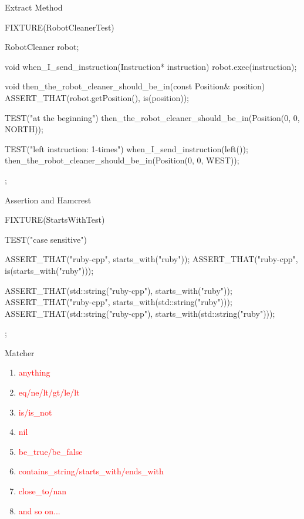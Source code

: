 \begin{frame}[fragile]{Extract Method}
\begin{c++}
FIXTURE(RobotCleanerTest)
{
    RobotCleaner robot;

    void when_I_send_instruction(Instruction* instruction)
    {
        robot.exec(instruction);
    }

    void then_the_robot_cleaner_should_be_in(const Position& position)
    {
        ASSERT_THAT(robot.getPosition(), is(position));
    }

    TEST("at the beginning")
    {
        then_the_robot_cleaner_should_be_in(Position(0, 0, NORTH));
    }

    TEST("left instruction: 1-times")
    {
        when_I_send_instruction(left());
        then_the_robot_cleaner_should_be_in(Position(0, 0, WEST));
    }
};
\end{c++}
\end{frame}

\begin{frame}[fragile]{Assertion and Hamcrest}
\begin{c++}
FIXTURE(StartsWithTest)
{
    TEST("case sensitive")
    {
        ASSERT_THAT("ruby-cpp", starts_with("ruby"));
        ASSERT_THAT("ruby-cpp", is(starts_with("ruby")));

        ASSERT_THAT(std::string("ruby-cpp"), starts_with("ruby"));
        ASSERT_THAT("ruby-cpp", starts_with(std::string("ruby")));
        ASSERT_THAT(std::string("ruby-cpp"), starts_with(std::string("ruby")));
    }
};
\end{c++}
\end{frame}

\begin{frame}{Matcher}
  \begin{enumerate}
    \item \textcolor{red}{anything}
    \item \textcolor{red}{eq/ne/lt/gt/le/lt}
    \item \textcolor{red}{is/is\_not}
    \item \textcolor{red}{nil}
    \item \textcolor{red}{be\_true/be\_false}
    \item \textcolor{red}{contains\_string/starts\_with/ends\_with}
    \item \textcolor{red}{close\_to/nan}
    \item \textcolor{red}{and so on...}
  \end{enumerate}
\end{frame}

